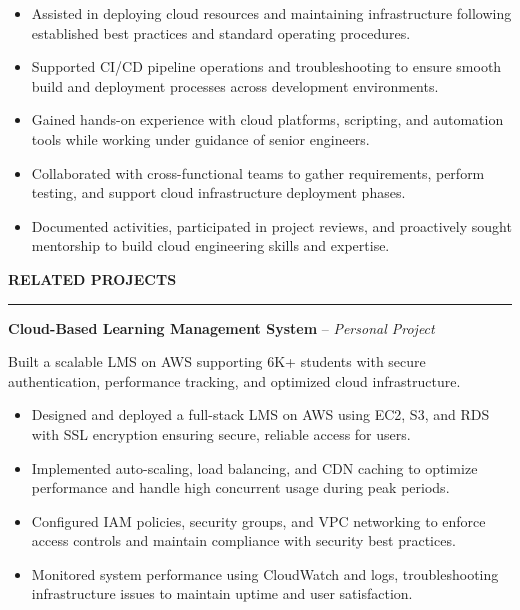 \documentclass[10pt,letterpaper]{article}
\begin{document}
\begin{itemize}
\item Assisted in deploying cloud resources and maintaining infrastructure following established best practices and standard operating procedures.
\item Supported CI/CD pipeline operations and troubleshooting to ensure smooth build and deployment processes across development environments.
\item Gained hands-on experience with cloud platforms, scripting, and automation tools while working under guidance of senior engineers.
\item Collaborated with cross-functional teams to gather requirements, perform testing, and support cloud infrastructure deployment phases.
\item Documented activities, participated in project reviews, and proactively sought mentorship to build cloud engineering skills and expertise.
\end{itemize}

\vspace{6pt}

\textbf{RELATED PROJECTS}\\[-8pt]
\noindent\rule{\textwidth}{1pt}

\vspace{-2pt}

\textbf{Cloud-Based Learning Management System} -- \emph{Personal Project}

\vspace{-1pt}

Built a scalable LMS on AWS supporting 6K+ students with secure authentication, performance tracking, and optimized cloud infrastructure.
\vspace{-1pt}
\begin{itemize}
\item Designed and deployed a full-stack LMS on AWS using EC2, S3, and RDS with SSL encryption ensuring secure, reliable access for users.
\item Implemented auto-scaling, load balancing, and CDN caching to optimize performance and handle high concurrent usage during peak periods.
\item Configured IAM policies, security groups, and VPC networking to enforce access controls and maintain compliance with security best practices.
\item Monitored system performance using CloudWatch and logs, troubleshooting infrastructure issues to maintain uptime and user satisfaction.
\end{itemize}
\end{document}
